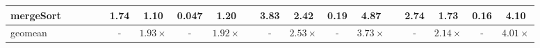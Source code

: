 \begin{tabular}{@{}l rrrr cccc r cccc r cccc@{}}
    mergeSort &&&&& 1.74 & 1.10 & 0.047 & 1.20 && 3.83 & 2.42 & 0.19 & 4.87  && 2.74  & 1.73 & 0.16  & 4.10 \\

    \midrule
   geomean &&&&& - & $1.93\times$ & - & $1.92\times$  && - & $2.53\times$ & - & $3.73\times$ && - & $2.14\times$  & -  & $4.01\times$ \\

    \bottomrule
  \end{tabular}
